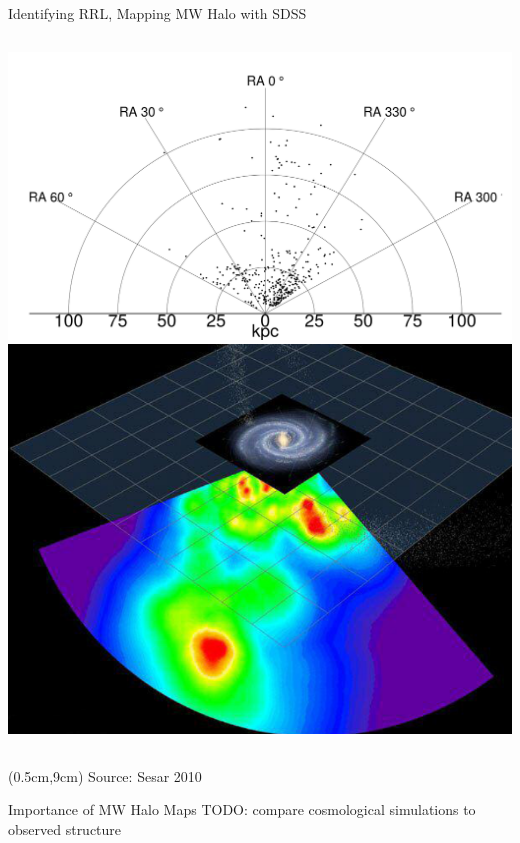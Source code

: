\documentclass[12pt]{beamer}
\newcommand{\todo}[1]{{\color{red}TODO: #1}}
\newcommand{\att}[1]{\begin{textblock*}{12cm}(0.5cm,9cm) %
  {\tiny Source: #1}
      \end{textblock*}}
\begin{document}
\begin{frame}{Identifying RRL, Mapping MW Halo with SDSS}
\begin{columns}
\begin{column}{0.5\textwidth}
      \vspace{-.2in}
      \begin{center}
      \includegraphics[scale=.1]{figs/density_true_points.png}\\
      \includegraphics[scale=.17]{figs/sesar_map.png}
      \end{center}
    \end{column}
\end{columns}

\att{Sesar 2010 \cite{sesar2010light}}
  
\end{frame}

\begin{frame}{Importance of MW Halo Maps}
\todo{compare cosmological simulations to observed structure}
\end{frame}

\end{document}
